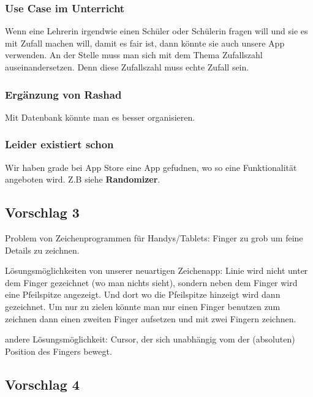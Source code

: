 \subsubsection{Use Case im Unterricht}
Wenn eine Lehrerin irgendwie einen Schüler oder Schülerin fragen will und sie es mit Zufall machen will, damit es fair ist, dann könnte sie auch unsere App verwenden. An der Stelle muss man sich mit dem Thema Zufallszahl auseinandersetzen. Denn diese Zufallszahl muss echte Zufall sein. 


\subsubsection{Ergänzung von Rashad}
Mit Datenbank könnte man es besser organisieren. 


\subsubsection{Leider existiert schon}
Wir haben grade bei App Store eine App gefudnen, wo so eine Funktionalität angeboten wird. Z.B siehe \textbf{Randomizer}. 



\subsection{Vorschlag 3}

Problem von Zeichenprogrammen für Handys/Tablets: Finger zu grob um feine Details zu zeichnen. 

Lösungsmöglichkeiten von unserer neuartigen Zeichenapp:
Linie wird nicht unter dem Finger gezeichnet (wo man nichts sieht), sondern neben dem Finger wird eine Pfeilspitze angezeigt. Und dort wo die Pfeilspitze hinzeigt wird dann gezeichnet.
Um nur zu zielen könnte man nur einen Finger benutzen zum zeichnen dann einen zweiten Finger aufsetzen und mit zwei Fingern zeichnen.

andere Lösungsmöglichkeit:
Cursor, der sich unabhängig vom der (absoluten) Position des Fingers bewegt.

\subsection{Vorschlag 4}

